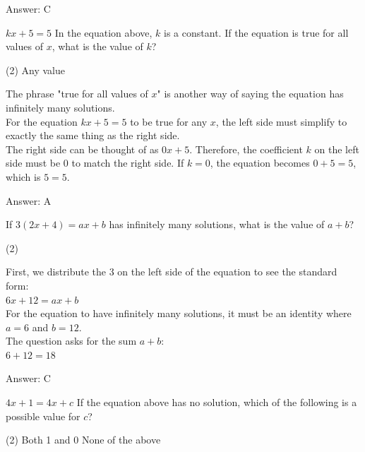 \documentclass[11pt,paper=a4,answers]{exam}
\begin{document}
\begin{questions}
\begin{solution}
\vspace{20pt}
Answer: \colorbox{yellow!100}{C}
\end{solution}

\question
$kx + 5 = 5$
In the equation above, $k$ is a constant. If the equation is true for all values of $x$, what is the value of $k$?
\begin{tasks}(2)
    \task Any value
\end{tasks}

\begin{solution}
The phrase "true for all values of $x$" is another way of saying the equation has infinitely many solutions. 
\\[10pt]
For the equation $kx + 5 = 5$ to be true for any $x$, the left side must simplify to exactly the same thing as the right side. 
\\[10pt]
The right side can be thought of as $0x + 5$. Therefore, the coefficient $k$ on the left side must be 0 to match the right side. If $k=0$, the equation becomes $0 + 5 = 5$, which is $5 = 5$.

\vspace{20pt}
Answer: \colorbox{yellow!100}{A}
\end{solution}

\question
If $3(2x + 4) = ax + b$ has infinitely many solutions, what is the value of $a + b$?
\begin{tasks}(2)
\end{tasks}

\begin{solution}
First, we distribute the 3 on the left side of the equation to see the standard form:
\\[10pt]
$6x + 12 = ax + b$ 
\\[10pt]
For the equation to have infinitely many solutions, it must be an identity where $a = 6$ and $b = 12$. 
\\[10pt]
The question asks for the sum $a + b$:
\\[10pt]
$6 + 12 = 18$

\vspace{20pt}
Answer: \colorbox{yellow!100}{C}
\end{solution}

\question
$4x + 1 = 4x + c$
If the equation above has no solution, which of the following is a possible value for $c$?
\begin{tasks}(2)
    \task Both 1 and 0
    \task None of the above
\end{tasks}


\end{questions}
\end{document}
